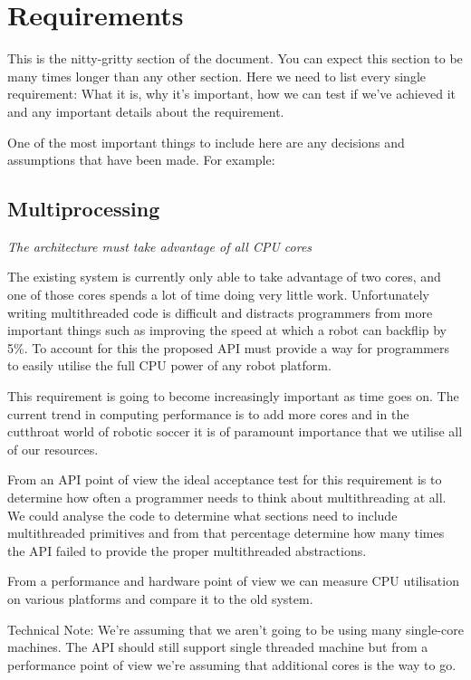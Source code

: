 \documentclass[english,12pt]{scrartcl}
\newcommand{\requirement}[1]{\textit{#1}}
\begin{document}
	\section{Requirements}
		This is the nitty-gritty section of the document. You can expect this section to be many
		times longer than any other section. Here we need to list every single requirement: What it
		is, why it's important, how we can test if we've achieved it and any important details about
		the requirement.

		One of the most important things to include here are any decisions and assumptions that have
		been made. For example:

		\subsection{Multiprocessing}
			\requirement{The architecture must take advantage of all CPU cores}

			The existing system is currently only able to take advantage of two cores, and one of
			those cores spends a lot of time doing very little work. Unfortunately writing
			multithreaded code is difficult and distracts programmers from more important things
			such as improving the speed at which a robot can backflip by 5\%. To account for this
			the proposed API must provide a way for programmers to easily utilise the full CPU power
			of any robot platform.

			This requirement is going to become increasingly important as time goes on. The current
			trend in computing performance is to add more cores and in the cutthroat world of
			robotic soccer it is of paramount importance that we utilise all of our resources.

			From an API point of view the ideal acceptance test for this requirement is to determine
			how often a programmer needs to think about multithreading at all. We could analyse the
			code to determine what sections need to include multithreaded primitives and from that
			percentage determine how many times the API failed to provide the proper multithreaded
			abstractions.

			From a performance and hardware point of view we can measure CPU utilisation on various
			platforms and compare it to the old system.

			Technical Note: We're assuming that we aren't going to be using many single-core
			machines. The API should still support single threaded machine but from a performance
			point of view we're assuming that additional cores is the way to go.
\end{document}

